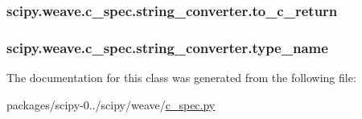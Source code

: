 \subsubsection[{to\+\_\+c\+\_\+return}]{\setlength{\rightskip}{0pt plus 5cm}scipy.\+weave.\+c\+\_\+spec.\+string\+\_\+converter.\+to\+\_\+c\+\_\+return}\label{classscipy_1_1weave_1_1c__spec_1_1string__converter_ae9a539d0b42accf82f25995428a672ee}
\hypertarget{classscipy_1_1weave_1_1c__spec_1_1string__converter_af9c0b23859ee9f9152db3b58e2cdd0bb}{}
\subsubsection[{type\+\_\+name}]{\setlength{\rightskip}{0pt plus 5cm}scipy.\+weave.\+c\+\_\+spec.\+string\+\_\+converter.\+type\+\_\+name}\label{classscipy_1_1weave_1_1c__spec_1_1string__converter_af9c0b23859ee9f9152db3b58e2cdd0bb}


The documentation for this class was generated from the following file\+:\begin{DoxyCompactItemize}
\item 
packages/scipy-\/0../scipy/weave/\hyperlink{c__spec_8py}{c\+\_\+spec.\+py}\end{DoxyCompactItemize}
